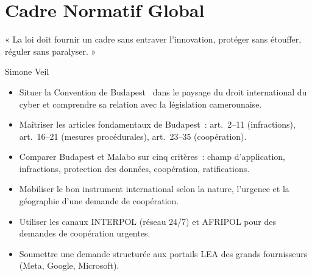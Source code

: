 
\chapter{Cadre Normatif Global}
\label{chap:norm-glob}

\epigraph{%
    « La loi doit fournir un cadre sans entraver l'innovation,
    protéger sans étouffer, réguler sans paralyser. »%
}{Simone Veil}


\begin{boxobjectifs}
\begin{itemize}
    \item Situer la Convention de Budapest~\cite{budapest2001} dans le paysage du droit
          international du cyber et comprendre sa relation avec la
          législation camerounaise.
    \item Maîtriser les articles fondamentaux de Budapest~: art.~2--11
          (infractions), art.~16--21 (mesures procédurales),
          art.~23--35 (coopération).
    \item Comparer Budapest et Malabo sur cinq critères~: champ d'application,
          infractions, protection des données, coopération, ratifications.
    \item Mobiliser le bon instrument international selon la nature,
          l'urgence et la géographie d'une demande de coopération.
    \item Utiliser les canaux INTERPOL (réseau 24/7) et AFRIPOL
          pour des demandes de coopération urgentes.
    \item Soumettre une demande structurée aux portails LEA des grands
          fournisseurs (Meta, Google, Microsoft).
\end{itemize}
\end{boxobjectifs}

\bigskip

